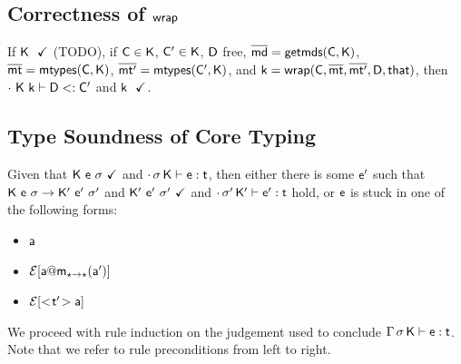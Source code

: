 \documentclass[acmlarge, anonymous, authordraft]{acmart}
\begin{document}
\subsection{Correctness of ${\sf{wrap}}$}

If $\WFp \K$ (TODO), if ${\sf{C}} \in {\sf{K}}$, ${\sf{C'}} \in {\sf{K}}$, ${\sf{D}}$ free, $\overline{{\sf{md}}} = {\sf{getmds}}({\sf{C}},{\sf{K}})$, $\overline{{\sf{mt}}} = {\sf{mtypes}}({\sf{C}},{\sf{K}})$, $\overline{{\sf{mt'}}} = {\sf{mtypes}}({\sf{C'}},{\sf{K}})$, and ${\sf{k}} = {\sf{wrap}}({\sf{C}},\overline{{\sf{mt}}},\overline{{\sf{mt'}}},{\sf{D}},{\sf{that}})$, then $\cdot~{\sf{K}}~{\sf{k}}\vdash {\sf{D}}<: {\sf{C'}}$ and $\WFp \k$.

\subsection{Type Soundness of Core \kafka Typing}

Given that ${\sf{K}}~{\sf{e}}~\sigma~\checkmark$ and $\EnvType\cdot\s\K\e\t$, then either there is some ${{{\sf{e'}}}}$ 
such that ${{\sf{K}}}~{{\sf{e}}}~{\sigma} \rightarrow {{\ensuremath{{\sf{K'}}}}}~{{{{\sf{e'}}}}}~{{{\sigma'}}}$ and ${{\sf{K'}}}~{{{\sf{e'}}}}~{{\sigma'}}~\checkmark$ and $\EnvType\cdot\sp\Kp\ep\t$ hold, 
or ${\sf{e}}$ is stuck in one of the following forms:
\begin{itemize} 
\item ${\sf{a}}$
\item $\EE[\DynCall\a\m{\ap}]$
\item $\EE[\SubCast\tp\a]$
\end{itemize}

We proceed with rule induction on the judgement used to conclude $\EnvType\Env\s\K\e\t$. 
Note that we refer to rule preconditions from left to right.
\end{document}
